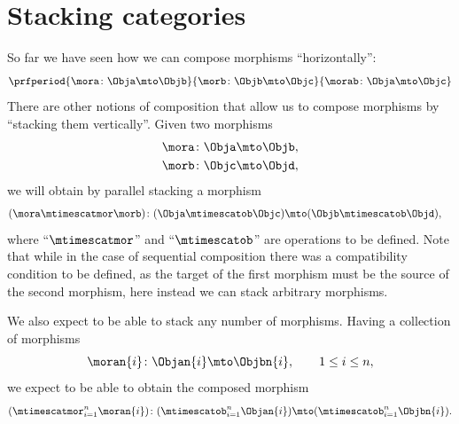 
\section{Stacking categories}
\label{sec:parallel-stacking}

So far we have seen how we can compose morphisms ``horizontally'':
%
\begin{equation}
    \prfperiod{
        \mora \colon \Obja \mto \Objb
    }{
        \morb\colon \Objb \mto \Objc
    }{
        \morab \colon \Obja \mto \Objc
    }
\end{equation}
%
There are other notions of composition that allow us to compose morphisms by ``stacking them vertically''.
Given two morphisms
%
\begin{align}
    \mora & \colon \Obja \mto \Objb, \\
    \morb & \colon \Objc \mto \Objd,
\end{align}
%
we will obtain by parallel stacking a morphism
%
\begin{align}
    (\mora\mtimescatmor \morb)
     & \colon (\Obja \mtimescatob \Objc) \mto (\Objb \mtimescatob \Objd),
\end{align}
%
where ``$\mtimescatmor$'' and ``$\mtimescatob$'' are operations to be defined.
Note that while in the case of sequential composition there was a compatibility condition to be defined, as the target of the first morphism must be the source of the second morphism, here instead we can stack arbitrary morphisms.

We also expect to be able to stack any number of morphisms.
Having a collection of morphisms
%
\begin{equation}
    \moran{i} \colon \Objan{i} \mto \Objbn{i}, \qquad 1 \leq i \leq n,
\end{equation}
%
we expect to be able to obtain the composed morphism
%
\begin{equation}
    (\mtimescatmor_{i=1}^n \moran{i} )
    \colon( \mtimescatob_{i=1}^n \Objan{i} )\mto (\mtimescatob_{i=1}^n \Objbn{i}).
\end{equation}


\begin{marginfigure}
    \centering
    \caption{Stacked morphisms}
    \label{fig:stacked-morphisms}
\end{marginfigure}

